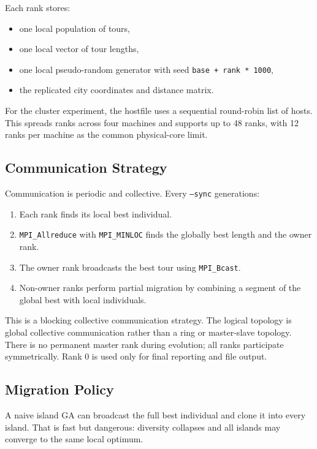 \documentclass[11pt,a4paper]{article}
\begin{document}
Each rank stores:

\begin{itemize}[leftmargin=*]
  \item one local population of tours,
  \item one local vector of tour lengths,
  \item one local pseudo-random generator with seed \texttt{base + rank * 1000},
  \item the replicated city coordinates and distance matrix.
\end{itemize}

For the cluster experiment, the hostfile uses a sequential round-robin list of
hosts. This spreads ranks across four machines and supports up to 48 ranks, with
12 ranks per machine as the common physical-core limit.

\subsection{Communication Strategy}
Communication is periodic and collective. Every \texttt{--sync} generations:

\begin{enumerate}[leftmargin=*]
  \item Each rank finds its local best individual.
  \item \texttt{MPI\_Allreduce} with \texttt{MPI\_MINLOC} finds the globally best
  length and the owner rank.
  \item The owner rank broadcasts the best tour using \texttt{MPI\_Bcast}.
  \item Non-owner ranks perform partial migration by combining a segment of the
  global best with local individuals.
\end{enumerate}

This is a blocking collective communication strategy. The logical topology is
global collective communication rather than a ring or master-slave topology.
There is no permanent master rank during evolution; all ranks participate
symmetrically. Rank 0 is used only for final reporting and file output.

\subsection{Migration Policy}
A naive island GA can broadcast the full best individual and clone it into every
island. That is fast but dangerous: diversity collapses and all islands may
converge to the same local optimum.
\end{document}
